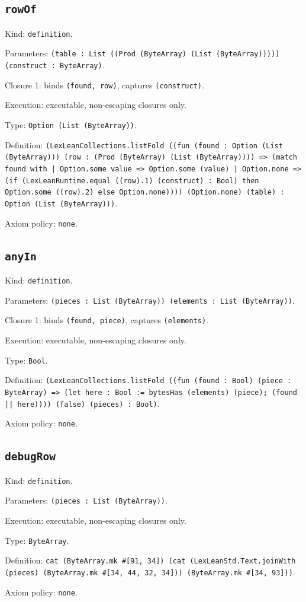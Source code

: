 \documentclass[11pt]{article}
\begin{document}
\subsection*{\texttt{rowOf}}
\noindent Kind: \texttt{definition}.\par
\noindent Parameters: \texttt{(table : List ((Prod (ByteArray) (List (ByteArray))))) (construct : ByteArray)}.\par
\noindent Closure 1: binds \texttt{(found, row)}, captures \texttt{(construct)}.\par
\noindent Execution: executable, non-escaping closures only.\par
\noindent Type: \texttt{Option (List (ByteArray))}.\par
\noindent Definition: \texttt{(LexLeanCollections.listFold ((fun (found : Option (List (ByteArray))) (row : (Prod (ByteArray) (List (ByteArray)))) => (match found with | Option.some value => Option.some (value) | Option.none => (if (LexLeanRuntime.equal ((row).1) (construct) : Bool) then Option.some ((row).2) else Option.none)))) (Option.none) (table) : Option (List (ByteArray)))}.\par
\noindent Axiom policy: \texttt{none}.\par
\subsection*{\texttt{anyIn}}
\noindent Kind: \texttt{definition}.\par
\noindent Parameters: \texttt{(pieces : List (ByteArray)) (elements : List (ByteArray))}.\par
\noindent Closure 1: binds \texttt{(found, piece)}, captures \texttt{(elements)}.\par
\noindent Execution: executable, non-escaping closures only.\par
\noindent Type: \texttt{Bool}.\par
\noindent Definition: \texttt{(LexLeanCollections.listFold ((fun (found : Bool) (piece : ByteArray) => (let here : Bool := bytesHas (elements) (piece); (found || here)))) (false) (pieces) : Bool)}.\par
\noindent Axiom policy: \texttt{none}.\par
\subsection*{\texttt{debugRow}}
\noindent Kind: \texttt{definition}.\par
\noindent Parameters: \texttt{(pieces : List (ByteArray))}.\par
\noindent Execution: executable, non-escaping closures only.\par
\noindent Type: \texttt{ByteArray}.\par
\noindent Definition: \texttt{cat (ByteArray.mk \#[91, 34]) (cat (LexLeanStd.Text.joinWith (pieces) (ByteArray.mk \#[34, 44, 32, 34])) (ByteArray.mk \#[34, 93]))}.\par
\noindent Axiom policy: \texttt{none}.\par
\end{document}
